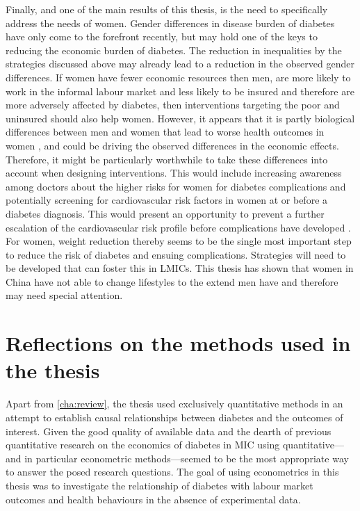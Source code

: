 Finally, and one of the main results of this thesis, is the need to specifically address the needs of women. Gender differences in disease burden of diabetes have only come to the forefront recently, but may hold one of the keys to reducing the economic burden of diabetes. The reduction in inequalities by the strategies discussed above may already lead to a reduction in the observed gender differences. If women have fewer economic resources then men, are more likely to work in the informal labour market and less likely to be insured \parencite{Galli2008} and therefore are more adversely affected by diabetes, then interventions targeting the poor and uninsured should also help women. However, it appears that it is partly biological differences between men and women that lead to worse health outcomes in women \parencite{Peters2015,Peters2014a,Peters2014,Bertram2010}, and could be driving the observed differences in the economic effects. Therefore, it might be particularly worthwhile to take these differences into account when designing interventions. This would include increasing awareness among doctors about the higher risks for women for diabetes complications and potentially screening for cardiovascular risk factors in women at or before a diabetes diagnosis. This would present an opportunity to prevent a further escalation of the cardiovascular risk profile before complications have developed \parencite{Peters2015}. For women, weight reduction thereby seems to be the single most important step to reduce the risk of diabetes and ensuing complications. Strategies will need to be developed that can foster this in \acp{LMIC}. This thesis has shown that women in China have not able to change lifestyles to the extend men have and therefore may need special attention.


\section{Reflections on the methods used in the thesis}

Apart from \ref{cha:review}, the thesis used exclusively quantitative methods in an attempt to establish causal relationships between diabetes and the outcomes of interest. Given the good quality of available data and the dearth of previous quantitative research on the economics of diabetes in \ac{MIC} using quantitative---and in particular econometric methods---seemed to be the most appropriate way to answer the posed research questions. The goal of using econometrics in this thesis was to investigate the relationship of diabetes with labour market outcomes and health behaviours in the absence of experimental data. 

